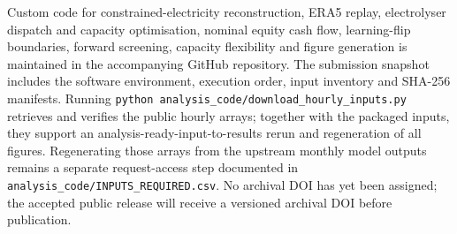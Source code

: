 \documentclass[11pt,a4paper]{article}
\begin{document}
Custom code for constrained-electricity reconstruction, ERA5 replay, electrolyser dispatch and capacity optimisation, nominal equity cash flow, learning-flip boundaries, forward screening, capacity flexibility and figure generation is maintained in the accompanying GitHub repository. The submission snapshot includes the software environment, execution order, input inventory and SHA-256 manifests. Running \texttt{python analysis\_code/download\_hourly\_inputs.py} retrieves and verifies the public hourly arrays; together with the packaged inputs, they support an analysis-ready-input-to-results rerun and regeneration of all figures. Regenerating those arrays from the upstream monthly model outputs remains a separate request-access step documented in \texttt{analysis\_code/INPUTS\_REQUIRED.csv}. No archival DOI has yet been assigned; the accepted public release will receive a versioned archival DOI before publication.
\end{document}
